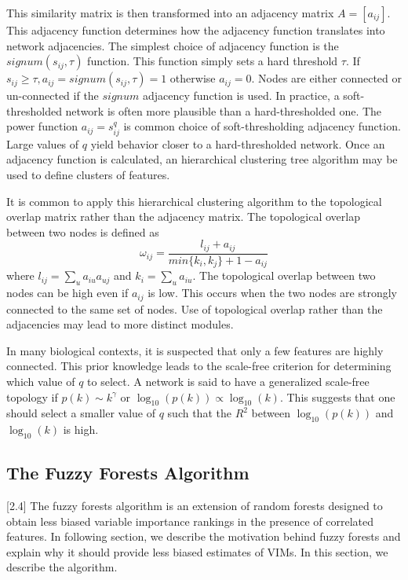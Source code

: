 \documentclass[article,shortnames]{jss}
\begin{document}
This similarity matrix is then transformed into an adjacency matrix $A=[a_{ij}]$.  This adjacency function determines how the adjacency function
translates into network adjacencies.  The simplest choice of adjacency function is the $signum(s_{ij},\tau)$ function.  This function
simply sets a hard threshold $\tau$.  If $s_{ij} \geq \tau, a_{ij}=signum(s_{ij},\tau)=1$ otherwise $a_{ij}=0$.  Nodes are either connected or 
un-connected if the $signum$ adjacency function is used.  In practice, a soft-thresholded network is often more plausible than a 
hard-thresholded one.  The power function $a_{ij}=s_{ij}^{q}$ is common choice of soft-thresholding adjacency function.  Large values
of $q$ yield behavior closer to a hard-thresholded network.  Once an adjacency function is calculated, an hierarchical clustering tree algorithm 
may be used to define clusters of features.

It is common to apply this hierarchical clustering algorithm to the topological overlap matrix rather than the adjacency matrix.  The topological
overlap between two nodes is defined as 
\begin{equation}
\omega_{ij} = \frac{l_{ij} + a_{ij}}{min\{k_{i},k_{j}\} + 1 - a_{ij}}
\end{equation} 
where $l_{ij}=\sum_{u}a_{iu}a_{uj}$ and $k_{i}=\sum_{u}a_{iu}$.  The topological overlap between two nodes can be high even if $a_{ij}$ is low.
This occurs when the two nodes are strongly connected to the same set of nodes.  Use of topological overlap rather
than the adjacencies may lead to more distinct modules.

In many biological contexts, it is suspected that only a few features are highly connected.  This prior knowledge leads to the scale-free criterion for
determining which value of $q$ to select.  A network is said to have a generalized scale-free topology if $p(k) \sim k^{\gamma}$ or
 $\log_{10}(p(k)) \propto \log_{10}(k)$.  This suggests that one should select a smaller value of $q$ such that the $R^{2}$ between 
  $\log_{10}(p(k))$ and $\log_{10}(k)$ is high.
  
\subsection{The Fuzzy Forests Algorithm}[2.4]
The fuzzy forests algorithm is an extension of random forests designed to obtain less biased variable importance rankings in the presence
of correlated features.  In following section, we describe the motivation behind fuzzy forests and explain why it should 
provide less biased estimates of VIMs.  In this section, we describe the algorithm.
\end{document}

